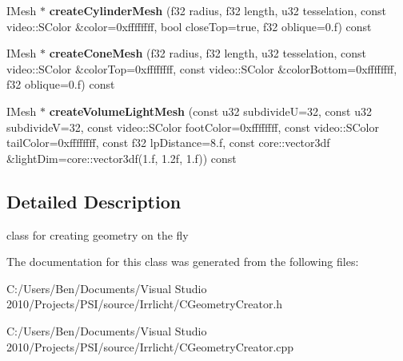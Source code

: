 \begin{DoxyCompactItemize}
\item 
\hypertarget{classirr_1_1scene_1_1_c_geometry_creator_adb7d8be35b21b7ac5c1e355176e3b2d3}{I\-Mesh $\ast$ {\bfseries create\-Cylinder\-Mesh} (f32 radius, f32 length, u32 tesselation, const video\-::\-S\-Color \&color=0xffffffff, bool close\-Top=true, f32 oblique=0.\-f) const }\label{classirr_1_1scene_1_1_c_geometry_creator_adb7d8be35b21b7ac5c1e355176e3b2d3}

\item 
\hypertarget{classirr_1_1scene_1_1_c_geometry_creator_a51dedd17466f0db5aaef9f73c714c6a9}{I\-Mesh $\ast$ {\bfseries create\-Cone\-Mesh} (f32 radius, f32 length, u32 tesselation, const video\-::\-S\-Color \&color\-Top=0xffffffff, const video\-::\-S\-Color \&color\-Bottom=0xffffffff, f32 oblique=0.\-f) const }\label{classirr_1_1scene_1_1_c_geometry_creator_a51dedd17466f0db5aaef9f73c714c6a9}

\item 
\hypertarget{classirr_1_1scene_1_1_c_geometry_creator_a95e418383e7bc28bb7081ac0cf67f1fa}{I\-Mesh $\ast$ {\bfseries create\-Volume\-Light\-Mesh} (const u32 subdivide\-U=32, const u32 subdivide\-V=32, const video\-::\-S\-Color foot\-Color=0xffffffff, const video\-::\-S\-Color tail\-Color=0xffffffff, const f32 lp\-Distance=8.\-f, const core\-::vector3df \&light\-Dim=core\-::vector3df(1.\-f, 1.\-2f, 1.\-f)) const }\label{classirr_1_1scene_1_1_c_geometry_creator_a95e418383e7bc28bb7081ac0cf67f1fa}

\end{DoxyCompactItemize}


\subsection{Detailed Description}
class for creating geometry on the fly 

The documentation for this class was generated from the following files\-:\begin{DoxyCompactItemize}
\item 
C\-:/\-Users/\-Ben/\-Documents/\-Visual Studio 2010/\-Projects/\-P\-S\-I/source/\-Irrlicht/C\-Geometry\-Creator.\-h\item 
C\-:/\-Users/\-Ben/\-Documents/\-Visual Studio 2010/\-Projects/\-P\-S\-I/source/\-Irrlicht/C\-Geometry\-Creator.\-cpp\end{DoxyCompactItemize}
